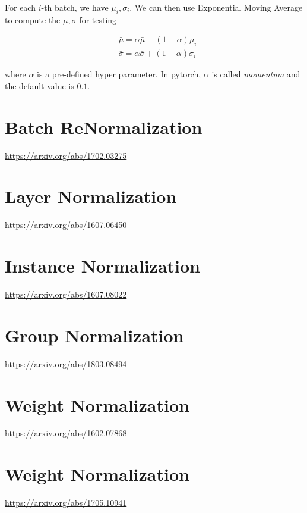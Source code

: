 \documentclass{article}
\begin{document}
            For each $ i $-th batch, we have $ \mu_{i}, \sigma_{i} $. We can then use
            Exponential Moving Average to compute the $ \bar{\mu}, \bar{\sigma} $ for testing

            \begin{align*}
                & \bar{\mu} = \alpha \bar{\mu} + ( 1 - \alpha ) \mu_{i} \\
                & \bar{\sigma} = \alpha \bar{\sigma} + ( 1 - \alpha ) \sigma_{i}
            \end{align*}

            where $ \alpha $ is a pre-defined hyper parameter. In pytorch, $
            \alpha $ is called \textit{momentum} and the default value is $ 0.1 $.
            

    \section*{Batch ReNormalization}
        \href{https://arxiv.org/abs/1702.03275}{https://arxiv.org/abs/1702.03275}

    \section*{Layer Normalization}
        \href{https://arxiv.org/abs/1607.06450}{https://arxiv.org/abs/1607.06450}

    \section*{Instance Normalization}
        \href{https://arxiv.org/abs/1607.08022}{https://arxiv.org/abs/1607.08022}
        
    \section*{Group Normalization}
        \href{https://arxiv.org/abs/1803.08494}{https://arxiv.org/abs/1803.08494}

    \section*{Weight Normalization}
        \href{https://arxiv.org/abs/1602.07868}{https://arxiv.org/abs/1602.07868}

    \section*{Weight Normalization}
        \href{https://arxiv.org/abs/1705.10941}{https://arxiv.org/abs/1705.10941}
\end{document}
